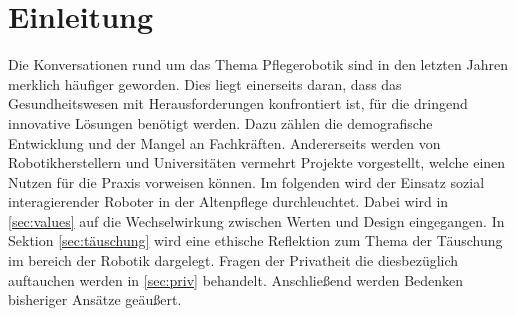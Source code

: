 \chapter{Einleitung}
\label{ch:einleitung}
Die  Konversationen  rund  um  das  Thema  Pflegerobotik  sind  in  den  letzten  Jahren  merklich  häufiger  geworden.  Dies  liegt  einerseits  daran,  dass  das  Gesundheitswesen  mit  Herausforderungen  konfrontiert  ist,  für  die  dringend  innovative  Lösungen  benötigt  werden.  Dazu  zählen  die  demografische  Entwicklung  und  der  Mangel  an  Fachkräften.  Andererseits  werden  von  Robotikherstellern  und  Universitäten  vermehrt  Projekte  vorgestellt, welche einen Nutzen für die Praxis vorweisen können. Im folgenden wird der Einsatz sozial interagierender Roboter in der Altenpflege durchleuchtet. Dabei wird in \ref{sec:values} auf die Wechselwirkung zwischen Werten und Design eingegangen. In Sektion \ref{sec:täuschung} wird eine ethische Reflektion zum Thema der Täuschung im bereich der Robotik dargelegt. Fragen der Privatheit die diesbezüglich auftauchen werden in \ref{sec:priv} behandelt. Anschließend werden Bedenken bisheriger Ansätze geäußert.





